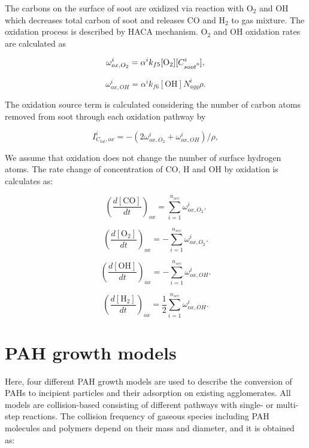 The carbons on the surface of soot are oxidized via reaction with $\mathrm{O_2}$ and $\mathrm{OH}$ which decreases total carbon of soot and releases CO and $\mathrm{H_2}$ to gas mixture. The oxidation process is described by HACA mechanism. $\mathrm{O_2}$ and $\mathrm{OH}$ oxidation rates are calculated as

\begin{equation}
	\omega^i_{ox,O_2} = \alpha^i k_{f5} [\mathrm{O_2}][C^i_{soot\mbox{\textdegree}}]
	\label{eqn:hacaO2Rate},
\end{equation}

\begin{equation}
	\omega^i_{ox,OH} = \alpha^i k_{f6} [\mathrm{OH}]N^i_{agg} \rho
	\label{eqn:hacaOHRate}.
\end{equation}

The oxidation source term is calculated considering the number of carbon atoms removed from soot through each oxidation pathway by

\begin{equation}
	I^i_{C_{tot},ox} = -(2\omega^i_{ox,O_2} + \omega^i_{ox,OH})/\rho
	\label{eqn:ICtot},
\end{equation}

We assume that oxidation does not change the number of surface hydrogen atoms. The rate change of concentration of CO, H and OH by oxidation is calculates as:

\begin{equation}
	\left(\frac{d\left[{\mathrm{CO}}\right]}{dt}\right)_{ox} = \sum_{i=1}^{n_{sec}}\omega^i_{ox,O_2}
	\label{eqn:COrate_ox}.
\end{equation}

\begin{equation}
	\left(\frac{d\left[{\mathrm{O_2}}\right]}{dt}\right)_{ox} = -\sum_{i=1}^{n_{sec}}\omega^i_{ox,O_2}
	\label{eqn:COrate_ox}.
\end{equation}

\begin{equation}
	\left(\frac{d\left[{\mathrm{OH}}\right]}{dt}\right)_{ox} = -\sum_{i=1}^{n_{sec}}\omega^i_{ox,OH}
	\label{eqn:Hrate_ox}.
\end{equation}

\begin{equation}
	\left(\frac{d\left[{\mathrm{H_2}}\right]}{dt}\right)_{ox} = \frac{1}{2}\sum_{i=1}^{n_{sec}}\omega^i_{ox,OH}
	\label{eqn:OHrate_ox}.
\end{equation}

\section{PAH growth models}
Here, four different PAH growth models are used to describe the conversion of PAHs to incipient particles and their adsorption on existing agglomerates. All models are collision-based consisting of different pathways with single- or multi-step reactions. The collision frequency of gaseous species including PAH molecules and polymers depend on their mass and diameter, and it is obtained as:

